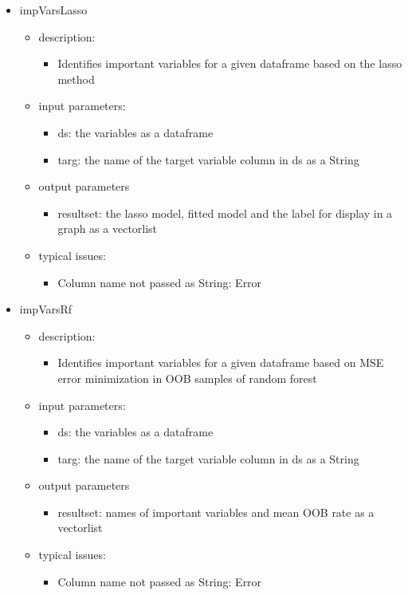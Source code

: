 \documentclass[12pt,a4paper,english]{article}
\begin{document}
\begin{itemize}
\item impVarsLasso
	\begin{itemize}
	\item description: 
		\begin{itemize}
		\item Identifies important variables for a given dataframe based on the lasso method
		\end{itemize}
	\item input parameters: 
		\begin{itemize}
		\item ds: the variables as a dataframe
		\item targ: the name of the target variable column in ds as a String
		\end{itemize}
	\item output parameters
		\begin{itemize}
		\item resultset: the lasso model, fitted model and the label for display in a graph as a vectorlist   
		\end{itemize}
	\item typical issues:
		\begin{itemize}
		\item Column name not passed as String: Error
		\end{itemize}
	\end{itemize}

\item impVarsRf
	\begin{itemize}
	\item description: 
		\begin{itemize}
		\item Identifies important variables for a given dataframe based on MSE error minimization in OOB samples of random forest
		\end{itemize}
	\item input parameters: 
		\begin{itemize}
		\item ds: the variables as a dataframe
		\item targ: the name of the target variable column in ds as a String
		\end{itemize}
	\item output parameters
		\begin{itemize}
		\item resultset: names of important variables and mean OOB rate as a vectorlist
		\end{itemize}
	\item typical issues:
		\begin{itemize}
		\item Column name not passed as String: Error
		\end{itemize}
	\end{itemize}


\end{itemize}
\end{document}

